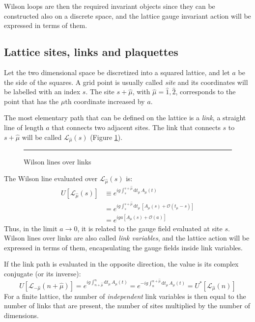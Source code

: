 Wilson loops are then the required invariant objects since they can be constructed also on a discrete space,
and the lattice gauge invariant action will be expressed in terms of them.

\subsection*{Lattice sites, links and plaquettes}
Let the two dimensional space be discretized into a squared lattice, and let $a$ be the side of the squares.
A grid point is usually called \emph{site} and its coordinates will be labelled with an index $s$.
The site $s + \hat\mu$, with $\hat\mu = \hat1,\hat2$, corresponds to the point that has the $\mu$th coordinate increased by $a$.

The most elementary path that can be defined on the lattice is a \emph{link},
\ie a straight line of length $a$ that connects two adjacent sites.
The link that connects $s$ to $s+\hat\mu$ will be called $\mathcal L_{\hat\mu}(s)$ (Figure \ref{fig:links}).
\begin{figure}[!htb]
    \centering
    \rule{3in}{1.5in}
    \caption{Wilson lines over links}
    \label{fig:links}
\end{figure}

The Wilson line evaluated over $\mathcal L_{\hat\mu}(s)$ is:
\begin{equation}\label{eq:link}
    \begin{aligned}
        U[\mathcal L_{\hat\mu}(s)] &\equiv e^{ig\int_s^{s+\hat\mu}\mathrm dt_\mu\,A_\mu(t)} \\
                       &= e^{ig\int_s^{s+\hat\mu}\mathrm dt_\mu\,\left[A_\mu(s) + \mathcal O\left(t_\mu-s\right)\right]} \\
                       &= e^{iga\left[A_\mu(s) + \mathcal O\left(a\right)\right]}
    \end{aligned}
\end{equation}
Thus, in the limit $a \to 0$, it is related to the gauge field evaluated at site $s$.
Wilson lines over links are also called \emph{link variables}, and the lattice action will be expressed in terms of them,
encapsulating the gauge fields inside link variables.

If the link path is evaluated in the opposite direction, the value is its complex conjugate (or its inverse):
\[
    U[\mathcal L_{-\hat\mu}(n+\hat\mu)] = e^{ig\int^n_{n+\hat\mu}\mathrm dt_\mu\,A_\mu(t)}
                                        = e^{-ig\int_n^{n+\hat\mu}\mathrm dt_\mu\,A_\mu(t)} = U^*[\mathcal L_{\hat\mu}(n)]
\]
For a finite lattice, the number of \emph{independent} link variables is then equal to the number of links that are present,
\ie the number of sites multiplied by the number of dimensions.

